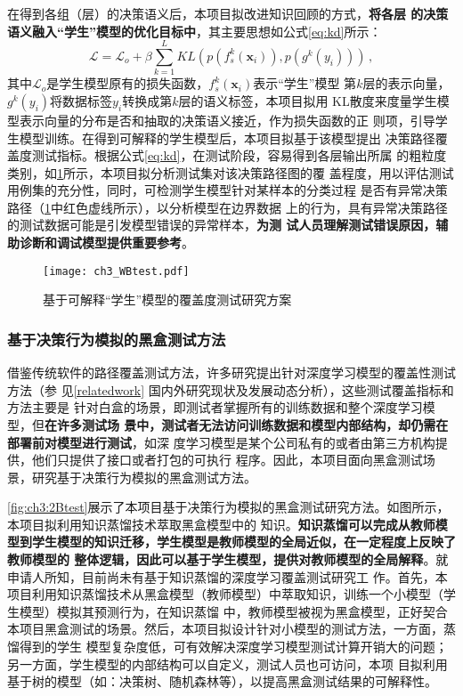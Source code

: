 在得到各组（层）的决策语义后，本项目拟改进知识回顾的方式，\textbf{将各层
    的决策语义融入“学生”模型的优化目标中}，其主要思想如公式\eqref{eq:kd}所示：
\begin{equation}
    \mathcal{L} = \mathcal{L}_o + \beta\sum_{k=1}^L KL(p(f_s^k(\bm x_i)), p(g^k(y_i))) \,,
    \label{eq:kd}
\end{equation}
其中$\mathcal L_o$是学生模型原有的损失函数，$f_s^k(\bm x_i)$表示``学生''模型
第$k$层的表示向量，$g^k(y_i)$将数据标签$y_i$转换成第$k$层的语义标签，本项目拟用
KL散度来度量学生模型表示向量的分布是否和抽取的决策语义接近，作为损失函数的正
则项，引导学生模型训练。在得到可解释的学生模型后，本项目拟基于该模型提出
决策路径覆盖度测试指标。根据公式\eqref{eq:kd}，在测试阶段，容易得到各层输出所属
的粗粒度类别，{如\cref{fig:ch3:WBtest}所示，本项目拟分析测试集对该决策路径图的覆
盖程度，用以评估测试用例集的充分性，同时，可检测学生模型针对某样本的分类过程
是否有异常决策路径（\cref{fig:ch3:WBtest}中红色虚线所示），以分析模型在边界数据
上的行为}，具有异常决策路径的测试数据可能是引发模型错误的异常样本，\textbf{为测
    试人员理解测试错误原因，辅助诊断和调试模型提供重要参考}。
\begin{figure}[htp]
    \begin{small}
        \begin{center}
            \texttt{[image: ch3\_WBtest.pdf]}
        \end{center}
        \caption{基于可解释``学生''模型的覆盖度测试研究方案}
        \label{fig:ch3:WBtest}
    \end{small}
\end{figure}

\subsubsection{基于决策行为模拟的黑盒测试方法}\label{ch3_1}

借鉴传统软件的路径覆盖测试方法，许多研究提出针对深度学习模型的覆盖性测试方法（参
见\ref{relatedwork} 国内外研究现状及发展动态分析），这些测试覆盖指标和方法主要是
针对白盒的场景，即测试者掌握所有的训练数据和整个深度学习模型，但\textbf{在许多测试场
    景中，测试者无法访问训练数据和模型内部结构，却仍需在部署前对模型进行测试}，如深
度学习模型是某个公司私有的或者由第三方机构提供，他们只提供了接口或者打包的可执行
程序。因此，本项目面向黑盒测试场景，研究基于决策行为模拟的黑盒测试方法。

\cref{fig:ch3:2Btest}展示了本项目基于决策行为模拟的黑盒测试研究方法。如图所示，本项目拟利用知识蒸馏技术萃取黑盒模型中的
知识。\textbf{知识蒸馏可以完成从教师模型到学生模型的知识迁移，学生模型是教师模型的全局近似，在一定程度上反映了教师模型的
    整体逻辑，因此可以基于学生模型，提供对教师模型的全局解释}。就申请人所知，目前尚未有基于知识蒸馏的深度学习覆盖测试研究工
作。首先，本项目利用知识蒸馏技术从黑盒模型（教师模型）中萃取知识，训练一个小模型（学生模型）模拟其预测行为，在知识蒸馏
中，教师模型被视为黑盒模型，正好契合本项目黑盒测试的场景。然后，本项目拟设计针对小模型的测试方法，一方面，蒸馏得到的学生
模型复杂度低，可有效解决深度学习模型测试计算开销大的问题；另一方面，学生模型的内部结构可以自定义，测试人员也可访问，本项
目拟利用基于树的模型（如：决策树、随机森林等），以提高黑盒测试结果的可解释性。

